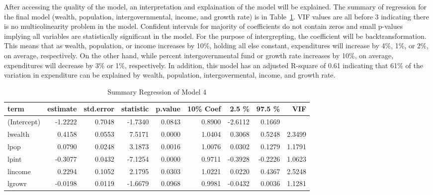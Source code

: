 \documentclass[11pt]{article}\usepackage[]{graphicx}\usepackage[]{color}
\begin{document}
\noindent After accessing the quality of the model, an interpretation and explaination of the model will be explained. The summary of regression for the final model (wealth, population, intergovernmental, income, and growth rate) is in Table~\ref{reg_summary_final}. VIF values are all before 3 indicating there is no multicolinearity problem in the model. Confident intervals for majority of coefficients do not contain zeros and small p-values implying all variables are statistically significant in the model. For the purpose of intergrepting, the coefficient will be backtransformation. This means that as wealth, population, or income increases by 10\%, holding all else constant, expenditures will increase by 4\%, 1\%, or 2\%, on average, respectively. On the other hand, while percent intergovernmental fund or growth rate increases by 10\%, on average, expenditures will decrease by 3\% or 1\%, respectively. In addition, this model has an adjusted R-square of 0.61 indicating that 61\% of the variation in expenditure can be explained by wealth, population, intergovermental, income, and growth rate.   

\begin{center}
\begin{table}[ht]
\centering
\begin{tabular}{lrrrrrrrr}
  \hline
term & estimate & std.error & statistic & p.value & 10\% Coef & 2.5 \% & 97.5 \% & VIF \\ 
  \hline
(Intercept) & -1.2222 & 0.7048 & -1.7340 & 0.0843 & 0.8900 & -2.6112 & 0.1669 &  \\ 
  lwealth & 0.4158 & 0.0553 & 7.5171 & 0.0000 & 1.0404 & 0.3068 & 0.5248 & 2.3499 \\ 
  lpop & 0.0790 & 0.0248 & 3.1873 & 0.0016 & 1.0076 & 0.0302 & 0.1279 & 1.1791 \\ 
  lpint & -0.3077 & 0.0432 & -7.1254 & 0.0000 & 0.9711 & -0.3928 & -0.2226 & 1.0623 \\ 
  lincome & 0.2294 & 0.1052 & 2.1795 & 0.0303 & 1.0221 & 0.0220 & 0.4367 & 2.5248 \\ 
  lgrowr & -0.0198 & 0.0119 & -1.6679 & 0.0968 & 0.9981 & -0.0432 & 0.0036 & 1.1281 \\ 
   \hline
\end{tabular}
\caption{Summary Regression of Model 4} 
\label{reg_summary_final}
\end{table}

\end{center}
\end{document}
